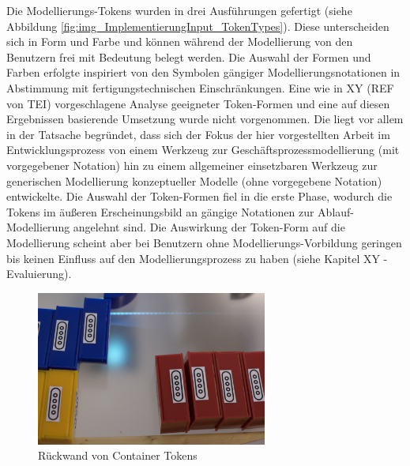 Die Modellierungs-Tokens wurden in drei Ausführungen gefertigt (siehe Abbildung \ref{fig:img_ImplementierungInput_TokenTypes}). Diese unterscheiden sich in Form und Farbe und können während der Modellierung von den Benutzern frei mit Bedeutung belegt werden. Die Auswahl der Formen und Farben erfolgte inspiriert von den Symbolen gängiger Modellierungsnotationen in Abstimmung mit fertigungstechnischen Einschränkungen. Eine wie in XY (REF von TEI) vorgeschlagene Analyse geeigneter Token-Formen und eine auf diesen Ergebnissen basierende Umsetzung wurde nicht vorgenommen. Die liegt vor allem in der Tatsache begründet, dass sich der Fokus der hier vorgestellten Arbeit im Entwicklungsprozess von einem Werkzeug zur Geschäftsprozessmodellierung (mit vorgegebener Notation) hin zu einem allgemeiner einsetzbaren Werkzeug zur generischen Modellierung konzeptueller Modelle (ohne vorgegebene Notation) entwickelte. Die Auswahl der Token-Formen fiel in die erste Phase, wodurch die Tokens im äußeren Erscheinungsbild an gängige Notationen zur Ablauf-Modellierung angelehnt sind. Die Auswirkung der Token-Form auf die Modellierung scheint aber bei Benutzern ohne Modellierungs-Vorbildung geringen bis keinen Einfluss auf den Modellierungsprozess zu haben (siehe Kapitel XY - Evaluierung).

\begin{figure}[htbp]
	\centering
		\includegraphics[height=2in]{img/ImplementierungInput/ContainerRueckseite.jpg}
	\caption{Rückwand von Container Tokens}
	\label{fig:img_ImplementierungInput_ContainerRueckseite}
\end{figure}

